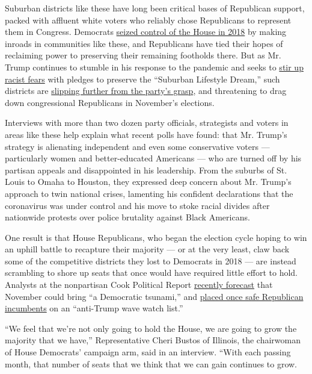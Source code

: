 Suburban districts like these have long been critical bases of
Republican support, packed with affluent white voters who reliably chose
Republicans to represent them in Congress. Democrats
\href{https://www.nytimes3xbfgragh.onion/2018/11/06/us/politics/midterm-elections-results.html}{seized
control of the House in 2018} by making inroads in communities like
these, and Republicans have tied their hopes of reclaiming power to
preserving their remaining footholds there. But as Mr. Trump continues
to stumble in his response to the pandemic and seeks to
\href{https://www.nytimes3xbfgragh.onion/2020/07/29/us/politics/trump-suburbs-housing-white-voters.html}{stir
up racist fears} with pledges to preserve the ``Suburban Lifestyle
Dream,'' such districts are
\href{https://www.nytimes3xbfgragh.onion/2020/07/10/us/politics/trump-white-voters-in-suburbs.html}{slipping
further from the party's grasp}, and threatening to drag down
congressional Republicans in November's elections.

Interviews with more than two dozen party officials, strategists and
voters in areas like these help explain what recent polls have found:
that Mr. Trump's strategy is alienating independent and even some
conservative voters --- particularly women and better-educated Americans
--- who are turned off by his partisan appeals and disappointed in his
leadership. From the suburbs of St. Louis to Omaha to Houston, they
expressed deep concern about Mr. Trump's approach to twin national
crises, lamenting his confident declarations that the coronavirus was
under control and his move to stoke racial divides after nationwide
protests over police brutality against Black Americans.

One result is that House Republicans, who began the election cycle
hoping to win an uphill battle to recapture their majority --- or at the
very least, claw back some of the competitive districts they lost to
Democrats in 2018 --- are instead scrambling to shore up seats that once
would have required little effort to hold. Analysts at the nonpartisan
Cook Political Report
\href{https://cookpolitical.com/analysis/national/national-politics/new-july-2020-electoral-college-ratings}{recently
forecast} that November could bring ``a Democratic tsunami,'' and
\href{https://twitter.com/Redistrict/status/1284116710866538496?s=20}{placed
once safe Republican incumbents} on an ``anti-Trump wave watch list.''

``We feel that we're not only going to hold the House, we are going to
grow the majority that we have,'' Representative Cheri Bustos of
Illinois, the chairwoman of House Democrats' campaign arm, said in an
interview. ``With each passing month, that number of seats that we think
that we can gain continues to grow.

